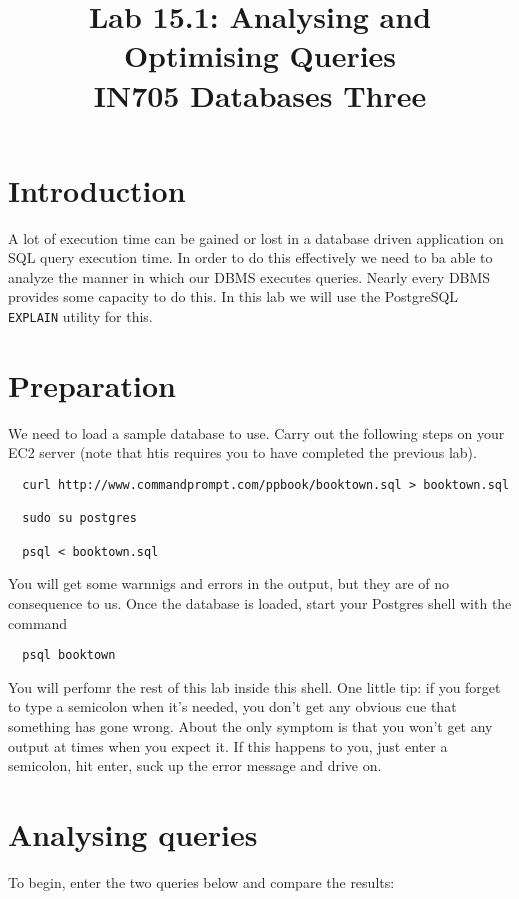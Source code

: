 \documentclass{article}
\begin{document}
\title{Lab 15.1: Analysing and Optimising Queries\\ IN705 Databases Three}
\date{}
\maketitle

\section*{Introduction}
A lot of execution time can be gained or lost in a database driven application on SQL query execution time.  In order to do this effectively we need to ba able to analyze the manner in which our DBMS executes queries.  Nearly every DBMS provides some capacity to do this.  In this lab we will use the PostgreSQL \texttt{EXPLAIN} utility for this.


\section{Preparation}
We need to load a sample database to use.  Carry out the following steps on your EC2 server (note that htis requires you to have completed the previous lab).

\begin{verbatim}
  curl http://www.commandprompt.com/ppbook/booktown.sql > booktown.sql

  sudo su postgres

  psql < booktown.sql
\end{verbatim}

You will get some warnnigs and errors in the output, but they are of no consequence to us.  Once the database is loaded, start your Postgres shell with the command

\begin{verbatim}
  psql booktown
\end{verbatim}
  
You will perfomr the rest of this lab inside this shell.  One little tip:  if you forget to type a semicolon when it's needed, you don't get any obvious cue that something has gone wrong.  About the only symptom is that you won't get any output at times when you expect it.  If this happens to you, just enter a semicolon, hit enter, suck up the error message and drive on.

\section{Analysing queries}
To begin, enter the two queries below and compare the results:
\end{document}
